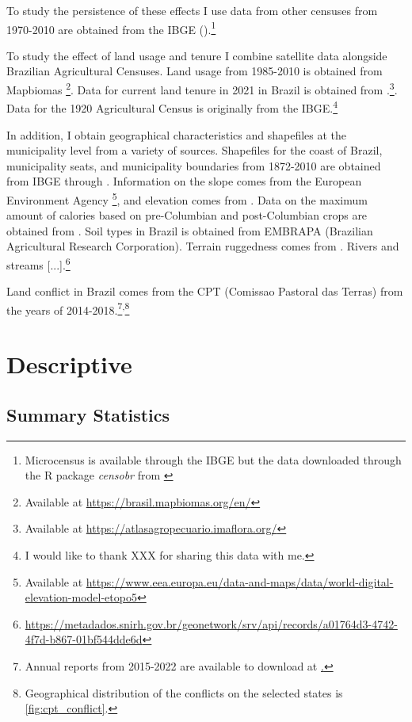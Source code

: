 \documentclass{article}
\begin{document}
To study the persistence of these effects I use data from other censuses from 1970-2010 are obtained from the IBGE (\textit{}).\footnote{Microcensus is available through the IBGE but the data downloaded through the R package \textit{censobr} from \textcite{Pereira2023-qv}}

To study the effect of land usage and tenure I combine satellite data alongside Brazilian Agricultural Censuses. 
Land usage from 1985-2010 is obtained from Mapbiomas \parencite{Souza2020-kb}\footnote{
  Available at \url{https://brasil.mapbiomas.org/en/}}.
Data for current land tenure in 2021 in Brazil is obtained from \textcite{Sparovek2019-dn}.\footnote{
  Available at \url{https://atlasagropecuario.imaflora.org/}}.
Data for the 1920 Agricultural Census is originally from the IBGE.\footnote{I would like to thank XXX for sharing this data with me.}

In addition, I obtain geographical characteristics and shapefiles at the municipality level from a variety of sources. 
Shapefiles for the coast of Brazil, municipality seats, and municipality boundaries from 1872-2010 are obtained from IBGE through \textcite{Pereira2023-qq}.
Information on the slope comes from the European Environment Agency
\footnote{
  Available at \url{https://www.eea.europa.eu/data-and-maps/data/world-digital-elevation-model-etopo5}}, and elevation comes from \textcite{Amatulli2018-gl}.
Data on the maximum amount of calories based on pre-Columbian and post-Columbian crops are obtained from \textcite{Galor2016-ba}. 
Soil types in Brazil is obtained from EMBRAPA (Brazilian Agricultural Research Corporation).
Terrain ruggedness comes from \textcite{Nunn2012-hb}.
Rivers and streams [...].\footnote{\url{https://metadados.snirh.gov.br/geonetwork/srv/api/records/a01764d3-4742-4f7d-b867-01bf544dde6d}}

Land conflict in Brazil comes from the CPT (Comissao Pastoral das Terras) from the years of 2014-2018.\footnote{Annual reports from 2015-2022 are available to download at \href{https://www.cptnacional.org.br/downlods/category/4-areas-em-conflito}.}\textsuperscript{,}\footnote{Geographical distribution of the conflicts on the selected states is \autoref{fig:cpt_conflict}.}

\parencite{Klein_Goldewijk2017-mr}

\section{Descriptive}

\subsection{Summary Statistics}
\end{document}
